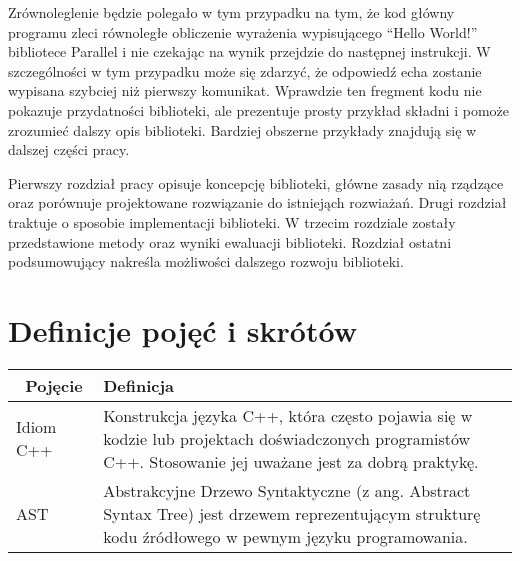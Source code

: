   Zrównoleglenie będzie polegało w tym przypadku na tym, że kod główny programu zleci równoległe obliczenie wyrażenia wypisującego ``Hello World!'' bibliotece Parallel i nie czekając na wynik przejdzie do następnej instrukcji.
  W szczególności w tym przypadku może się zdarzyć, że odpowiedź echa zostanie wypisana szybciej niż pierwszy komunikat.
  Wprawdzie ten fregment kodu nie pokazuje przydatności biblioteki, ale prezentuje prosty przykład składni i pomoże zrozumieć dalszy opis biblioteki.
  Bardziej obszerne przykłady znajdują się w dalszej części pracy.

  
  Pierwszy rozdział pracy opisuje koncepcję biblioteki, główne zasady nią rządzące oraz porównuje projektowane rozwiązanie do istniejąch rozwiażań.
  Drugi rozdział traktuje o sposobie implementacji biblioteki.
  W trzecim rozdziale zostały przedstawione metody oraz wyniki ewaluacji biblioteki.
  Rozdział ostatni podsumowujący nakreśla możliwości dalszego rozwoju biblioteki.

\newpage
\section*{Definicje pojęć i skrótów}
\begin{tabular}{ | l | p{} |}
  \hline\
  \textbf{Pojęcie} & \textbf{Definicja} \\ \hline
  Idiom C++ & Konstrukcja języka C++, która często pojawia się w kodzie lub projektach doświadczonych programistów C++. Stosowanie jej uważane jest za dobrą praktykę.\\ \hline
  AST & Abstrakcyjne Drzewo Syntaktyczne (z ang. Abstract Syntax Tree) jest drzewem reprezentującym strukturę kodu źródłowego w pewnym języku programowania.\\
  
  \hline
\end{tabular} 